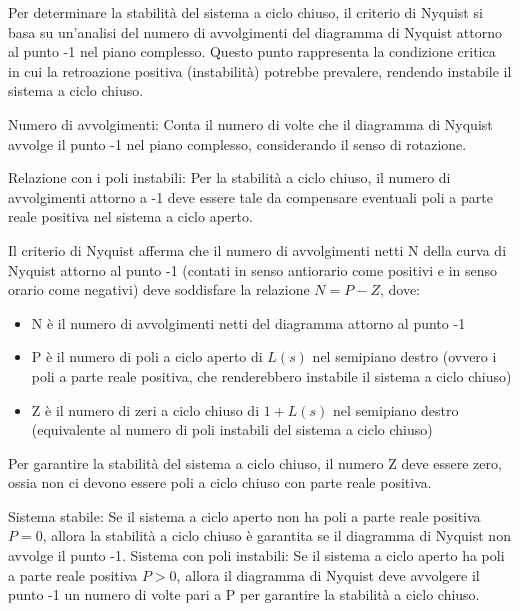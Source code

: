 Per determinare la stabilità del sistema a ciclo chiuso, il criterio di Nyquist si basa su un'analisi del numero di avvolgimenti del diagramma di Nyquist attorno al punto -1 nel piano complesso. Questo punto rappresenta la condizione critica in cui la retroazione positiva (instabilità) potrebbe prevalere, rendendo instabile il sistema a ciclo chiuso.

Numero di avvolgimenti: Conta il numero di volte che il diagramma di Nyquist avvolge il punto -1 nel piano complesso, considerando il senso di rotazione.

Relazione con i poli instabili: Per la stabilità a ciclo chiuso, il numero di avvolgimenti attorno a -1 deve essere tale da compensare eventuali poli a parte reale positiva nel sistema a ciclo aperto.

Il criterio di Nyquist afferma che il numero di avvolgimenti netti N della curva di Nyquist attorno al punto -1 (contati in senso antiorario come positivi e in senso orario come negativi) deve soddisfare la relazione \(N=P-Z\), dove: 
\begin{itemize}
    \item N è il numero di avvolgimenti netti del diagramma attorno al punto -1
    \item P è il numero di poli a ciclo aperto di \(L(s)\) nel semipiano destro (ovvero i poli a parte reale positiva, che renderebbero instabile il sistema a ciclo chiuso)
    \item Z è il numero di zeri a ciclo chiuso di \(1+L(s)\) nel semipiano destro (equivalente al numero di poli instabili del sistema a ciclo chiuso)
\end{itemize}
Per garantire la stabilità del sistema a ciclo chiuso, il numero Z deve essere zero, ossia non ci devono essere poli a ciclo chiuso con parte reale positiva.

Sistema stabile: Se il sistema a ciclo aperto non ha poli a parte reale positiva \(P=0\), allora la stabilità a ciclo chiuso è garantita se il diagramma di Nyquist non avvolge il punto -1.
Sistema con poli instabili: Se il sistema a ciclo aperto ha poli a parte reale positiva \(P>0\), allora il diagramma di Nyquist deve avvolgere il punto -1 un numero di volte pari a P per garantire la stabilità a ciclo chiuso.